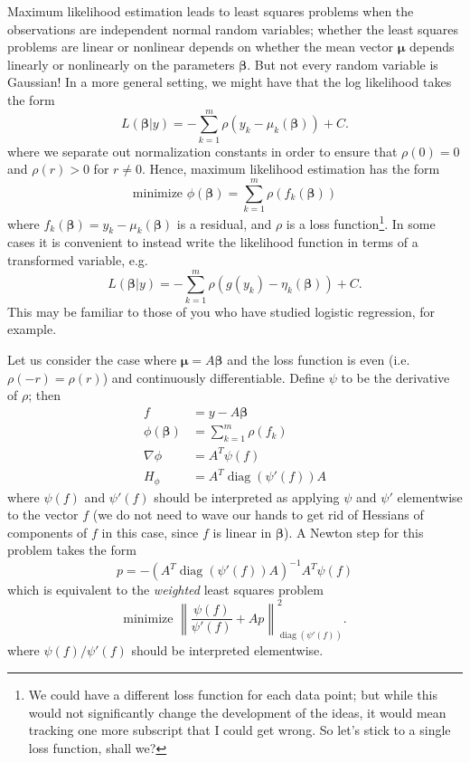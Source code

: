 \documentclass[12pt, leqno]{article} %
\newcommand{\bfmu}{\boldsymbol{\mu}}
\newcommand{\bfbeta}{\boldsymbol{\beta}}
\begin{document}
Maximum likelihood estimation leads to least squares problems when the
observations are independent normal random variables; whether the
least squares problems are linear or nonlinear depends on whether the
mean vector $\bfmu$ depends linearly or nonlinearly on the
parameters $\bfbeta$.  But not every random variable is Gaussian!
In a more general setting, we might have that the log likelihood takes
the form
\[
  L(\bfbeta | y) = -\sum_{k=1}^m \rho(y_k-\mu_k(\bfbeta)) + C.
\]
where we separate out normalization constants in order to ensure
that $\rho(0) = 0$ and $\rho(r) > 0$ for $r \neq 0$.  Hence, maximum
likelihood estimation has the form
\[
  \mbox{minimize } \phi(\bfbeta) = \sum_{k=1}^m \rho(f_k(\bfbeta))
\]
where $f_k(\bfbeta) = y_k-\mu_k(\bfbeta)$ is a residual, and $\rho$
is a loss function\footnote{We could have a different loss function
  for each data point; but while this would not significantly change the
  development of the ideas, it would mean tracking one more subscript
  that I could get wrong.  So let's stick to a single loss function,
  shall we?}.
In some cases it is convenient to instead write the likelihood
function in terms of a transformed variable, e.g.
\[
  L(\bfbeta | y) = -\sum_{k=1}^m \rho(g(y_k)-\eta_k(\bfbeta)) + C.
\]
This may be familiar to those of you who have studied logistic
regression, for example.

Let us consider the case where $\bfmu = A \bfbeta$ and the loss
function is even (i.e.~$\rho(-r) = \rho(r)$) and continuously
differentiable.  Define $\psi$ to be the derivative of $\rho$;
then
\begin{align*}
  f &= y-A\bfbeta \\
  \phi(\bfbeta) &= \sum_{k=1}^m \rho(f_k) \\
  \nabla \phi &= A^T \psi(f) \\
  H_\phi &= A^T \operatorname{diag}(\psi'(f)) A
\end{align*}
where $\psi(f)$ and $\psi'(f)$ should be interpreted as applying
$\psi$ and $\psi'$ elementwise to the vector $f$ (we do not need
to wave our hands to get rid of Hessians of components of $f$
in this case, since $f$ is linear in $\bfbeta$).  A Newton step
for this problem takes the form
\[
  p = -(A^T \operatorname{diag}(\psi'(f)) A)^{-1} A^T \psi(f)
\]
which is equivalent to the {\em weighted} least squares problem
\[
  \mbox{minimize } \left\| \frac{\psi(f)}{\psi'(f)} + Ap \right\|_{\operatorname{diag}(\psi'(f))}^2.
\]
where $\psi(f)/\psi'(f)$ should be interpreted elementwise.
\end{document}
